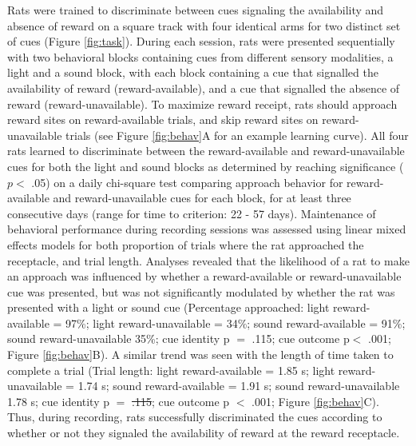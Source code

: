 \documentclass[11pt]{article}
\providecommand{\DIFadd}[1]{{\protect\color{blue}\uwave{#1}}} %
\providecommand{\DIFdel}[1]{{\protect\color{red}\sout{#1}}}                      %
\providecommand{\DIFaddbegin}{} %
\providecommand{\DIFaddend}{} %
\providecommand{\DIFdelbegin}{} %
\providecommand{\DIFdelend}{} %
\newcommand{\DIFscaledelfig}{0.5}
\newlength{\DIFdelgraphicswidth} %
\newlength{\DIFdelgraphicsheight} %
\newcommand{\DIFaddincludegraphics}[2][]{{\color{blue}\fbox{\DIFOincludegraphics[#1]{#2}}}} %
\newcommand{\DIFdelincludegraphics}[2][]{%
\sbox{\DIFdelgraphicsbox}{\DIFOincludegraphics[#1]{#2}}%
\settoboxwidth{\DIFdelgraphicswidth}{\DIFdelgraphicsbox} %
\settoboxtotalheight{\DIFdelgraphicsheight}{\DIFdelgraphicsbox} %
\scalebox{\DIFscaledelfig}{%
\parbox[b]{\DIFdelgraphicswidth}{\usebox{\DIFdelgraphicsbox}\\[-\baselineskip] \rule{\DIFdelgraphicswidth}{0em}}\llap{\resizebox{\DIFdelgraphicswidth}{\DIFdelgraphicsheight}{%
\setlength{\unitlength}{\DIFdelgraphicswidth}%
\begin{picture}(1,1)%
\thicklines\linethickness{2pt} %
{\color[rgb]{1,0,0}\put(0,0){\framebox(1,1){}}}%
{\color[rgb]{1,0,0}\put(0,0){\line( 1,1){1}}}%
{\color[rgb]{1,0,0}\put(0,1){\line(1,-1){1}}}%
\end{picture}%
}\hspace*{3pt}}} %
} %
\DeclareRobustCommand{\DIFaddbegin}{\DIFOaddbegin \let\includegraphics\DIFaddincludegraphics} %
\DeclareRobustCommand{\DIFaddend}{\DIFOaddend \let\includegraphics\DIFOincludegraphics} %
\DeclareRobustCommand{\DIFdelbegin}{\DIFOdelbegin \let\includegraphics\DIFdelincludegraphics} %
\DeclareRobustCommand{\DIFdelend}{\DIFOaddend \let\includegraphics\DIFOincludegraphics} %
\begin{document}
Rats were trained to discriminate between cues signaling the
availability and absence of reward on a square track with four
identical arms for two distinct set of cues (Figure
\ref{fig:task}). During each session, rats were presented sequentially
with two behavioral blocks containing cues from different sensory
modalities, a light and a sound block, with each block containing a
cue that signalled the availability of reward (reward-available), and
a cue that signalled the absence of reward (reward-unavailable). To
maximize reward receipt, rats should approach reward sites on
reward-available trials, and skip reward sites on reward-unavailable
trials (see Figure \ref{fig:behav}A for an example learning
curve). All four rats learned to discriminate between the
reward-available and reward-unavailable cues for both the light and
sound blocks as determined by reaching significance ($p <$ .05) on a
daily chi-square test comparing approach behavior for reward-available
and reward-unavailable cues for each block, for at least three
consecutive days (range for time to criterion: 22 - 57
days). Maintenance of behavioral performance during recording sessions
was assessed using linear mixed effects models for both proportion of
trials where the rat approached the receptacle, and trial
length. Analyses revealed that the likelihood of a rat to make an
approach was influenced by whether a reward-available or reward-unavailable cue was presented, but was not significantly modulated by whether the rat was presented with a light or sound cue (Percentage
approached: light reward-available = 97\%; light reward-unavailable =
34\%; sound reward-available = 91\%; sound reward-unavailable 35\%; cue identity p
$=$ .115; cue outcome p$<$ .001; Figure \ref{fig:behav}B). A similar trend was seen with the
length of time taken to complete a trial (Trial length: light
reward-available = 1.85 s; light reward-unavailable = 1.74 s; sound
reward-available = 1.91 s; sound reward-unavailable 1.78 s; cue identity p $=$ \DIFdelbegin \DIFdel{.115}\DIFdelend \DIFaddbegin \DIFadd{.106}\DIFaddend ; cue outcome p $<$ .001; Figure \ref{fig:behav}C). Thus, during recording, rats successfully
discriminated the cues according to whether or not they signaled the
availability of reward at the reward receptacle.
\end{document}
